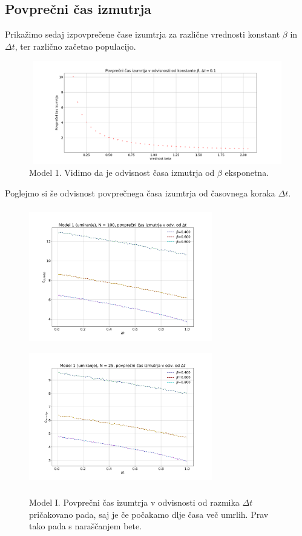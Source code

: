 \documentclass[11pt, a4paper]{article}
\begin{document}
 \subsection{Povprečni čas izmutrja}
Prikažimo sedaj izpovprečene čase izumtrja za različne vrednosti konstant $\beta$ in $\Delta t $, ter različno začetno populacijo.
   \begin{figure}[H]
\centering
  \includegraphics[width=16cm, height=4.5cm]{prva_povprecnicas.png}
   \caption{Model 1. Vidimo da je odvisnost časa izmutrja od $\beta$ eksponetna.}   
 \end{figure}
Poglejmo si še odvisnost povprečnega časa izumtrja od časovnega koraka $\Delta t$.
  \begin{figure}[H]
\centering
  \includegraphics[width=8cm, height=6cm]{prva_tretji_del2.pdf}
    \includegraphics[width=8cm, height=6cm]{prva_tretji_del2b.pdf}
   \caption{Model I. Povprečni čas izumtrja v odvisnosti od razmika $\Delta t$ pričakovano pada, saj je če počakamo dlje časa več umrlih. Prav tako pada s naraščanjem bete.}   
 \end{figure}
  
\end{document}
